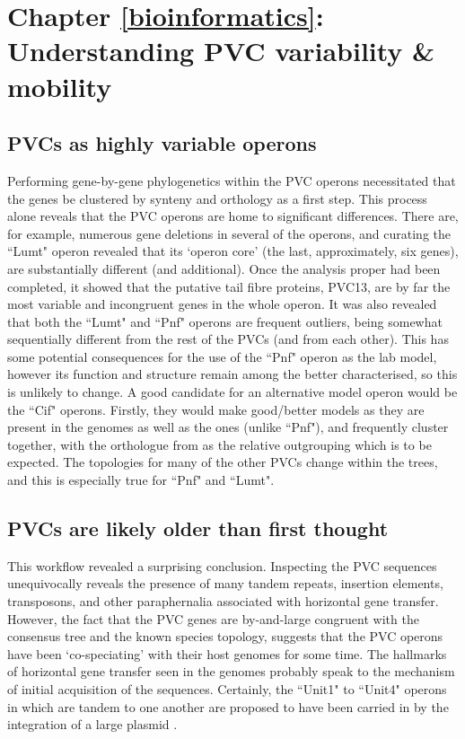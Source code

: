 \section{Chapter \ref{bioinformatics}: Understanding PVC variability \& mobility} 
\subsection{PVCs as highly variable operons}
Performing gene-by-gene phylogenetics within the PVC operons necessitated that the genes be clustered by synteny and orthology as a first step. This process alone reveals that the PVC operons are home to significant differences. There are, for example, numerous gene deletions in several of the operons, and curating the ``Lumt" operon revealed that its `operon core' (the last, approximately, six genes), are substantially different (and additional). Once the analysis proper had been completed, it showed that the putative tail fibre proteins, PVC13, are by far the most variable and incongruent genes in the whole operon. It was also revealed that both the ``Lumt" and ``Pnf" operons are frequent outliers, being somewhat sequentially different from the rest of the PVCs (and from each other). This has some potential consequences for the use of the ``Pnf" operon as the lab model, however its function and structure remain among the better characterised, so this is unlikely to change. A good candidate for an alternative model operon would be the ``Cif" operons. Firstly, they would make good/better models as they are present in the \Plum{} genomes as well as the \Pasy{} ones (unlike ``Pnf"), and frequently cluster together, with the orthologue from \Plum{} as the relative outgrouping which is to be expected. The topologies for many of the other PVCs change within the trees, and this is especially true for ``Pnf" and ``Lumt".

\subsection{PVCs are likely older than first thought}
This workflow revealed a surprising conclusion. Inspecting the PVC sequences unequivocally reveals the presence of many tandem repeats, insertion elements, transposons, and other paraphernalia associated with horizontal gene transfer. However, the fact that the PVC genes are by-and-large congruent with the consensus tree and the known species topology, suggests that the PVC operons have been `co-speciating' with their host genomes for some time. The hallmarks of horizontal gene transfer seen in the genomes probably speak to the mechanism of initial acquisition of the sequences. Certainly, the ``Unit1" to ``Unit4" operons in \Plum{} which are tandem to one another are proposed to have been carried in by the integration of a large plasmid \citep{Yang2006}.


